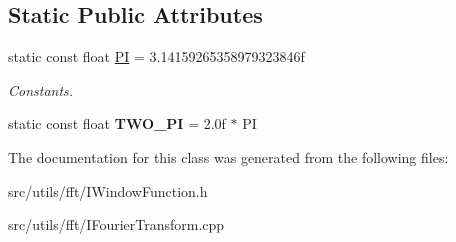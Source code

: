 \subsection*{Static Public Attributes}
\begin{DoxyCompactItemize}
\item 
\mbox{\label{class_i_window_function_a682f2069fe09b43f886ca8235b00a030}} 
static const float \hyperlink{class_i_window_function_a682f2069fe09b43f886ca8235b00a030}{PI} = 3.\+14159265358979323846f
\begin{DoxyCompactList}\small\item\em Constants. \end{DoxyCompactList}\item 
\mbox{\label{class_i_window_function_a129f803adb97f09c25d2f48aca352bbe}} 
static const float {\bfseries T\+W\+O\+\_\+\+PI} = 2.\+0f $\ast$ PI
\end{DoxyCompactItemize}


The documentation for this class was generated from the following files\+:\begin{DoxyCompactItemize}
\item 
src/utils/fft/I\+Window\+Function.\+h\item 
src/utils/fft/I\+Fourier\+Transform.\+cpp\end{DoxyCompactItemize}
